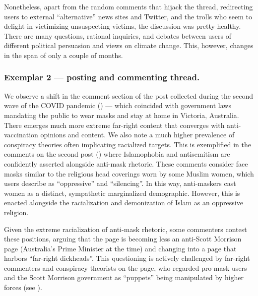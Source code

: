 Nonetheless, apart from the random comments that hijack the thread, redirecting users to external ``alternative'' news sites and Twitter, and the trolls who seem to delight in victimizing unsuspecting victims, the discussion was pretty healthy.
There are many questions, rational inquiries, and debates between users of different political persuasion and views on climate change.
This, however, changes in the span of only a couple of months.

\subsubsection*{Exemplar 2 --- posting and commenting thread.}
We observe a shift in the comment section of the post collected during the second wave of the COVID pandemic () --- which coincided with government laws mandating the public to wear masks and stay at home in Victoria, Australia.
There emerges much more extreme far-right content that converges with anti-vaccination opinions and content.
We also note a much higher prevalence of conspiracy theories often implicating racialized targets.
This is exemplified in the comments on the second post () where Islamophobia and antisemitism are confidently asserted alongside anti-mask rhetoric.
These comments consider face masks similar to the religious head coverings worn by some Muslim women, which users describe as ``oppressive'' and ``silencing''. 
In this way, anti-maskers cast women as a distinct, sympathetic marginalized demographic.
However, this is enacted alongside the racialization and demonization of Islam as an oppressive religion. 

Given the extreme racialization of anti-mask rhetoric, some commenters contest these positions, arguing that the page is becoming less an anti-Scott Morrison page (Australia's Prime Minister at the time) and changing into a page that harbors ``far-right dickheads''.
This questioning is actively challenged by far-right commenters and conspiracy theorists on the page, who regarded pro-mask users and the Scott Morrison government as ``puppets'' being manipulated by higher forces (see ). 

